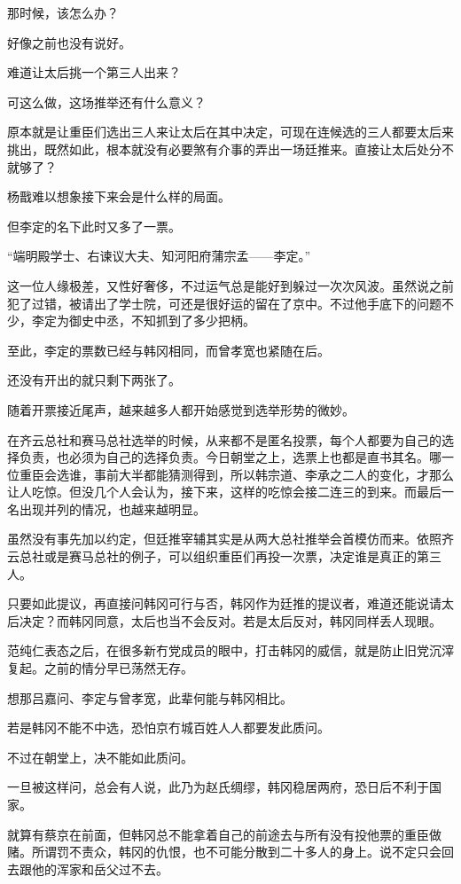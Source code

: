 那时候，该怎么办？

好像之前也没有说好。

难道让太后挑一个第三人出来？

可这么做，这场推举还有什么意义？

原本就是让重臣们选出三人来让太后在其中决定，可现在连候选的三人都要太后来挑出，既然如此，根本就没有必要煞有介事的弄出一场廷推来。直接让太后处分不就够了？

杨戬难以想象接下来会是什么样的局面。

但李定的名下此时又多了一票。

“端明殿学士、右谏议大夫、知河阳府蒲宗孟——李定。”

这一位人缘极差，又性好奢侈，不过运气总是能好到躲过一次次风波。虽然说之前犯了过错，被请出了学士院，可还是很好运的留在了京中。不过他手底下的问题不少，李定为御史中丞，不知抓到了多少把柄。

至此，李定的票数已经与韩冈相同，而曾孝宽也紧随在后。

还没有开出的就只剩下两张了。

随着开票接近尾声，越来越多人都开始感觉到选举形势的微妙。

在齐云总社和赛马总社选举的时候，从来都不是匿名投票，每个人都要为自己的选择负责，也必须为自己的选择负责。今日朝堂之上，选票上也都是直书其名。哪一位重臣会选谁，事前大半都能猜测得到，所以韩宗道、李承之二人的变化，才那么让人吃惊。但没几个人会认为，接下来，这样的吃惊会接二连三的到来。而最后一名出现并列的情况，也越来越明显。

虽然没有事先加以约定，但廷推宰辅其实是从两大总社推举会首模仿而来。依照齐云总社或是赛马总社的例子，可以组织重臣们再投一次票，决定谁是真正的第三人。

只要如此提议，再直接问韩冈可行与否，韩冈作为廷推的提议者，难道还能说请太后决定？而韩冈同意，太后也当不会反对。若是太后反对，韩冈同样丢人现眼。

范纯仁表态之后，在很多新冇党成员的眼中，打击韩冈的威信，就是防止旧党沉滓复起。之前的情分早已荡然无存。

想那吕嘉问、李定与曾孝宽，此辈何能与韩冈相比。

若是韩冈不能不中选，恐怕京冇城百姓人人都要发此质问。

不过在朝堂上，决不能如此质问。

一旦被这样问，总会有人说，此乃为赵氏绸缪，韩冈稳居两府，恐日后不利于国家。

就算有蔡京在前面，但韩冈总不能拿着自己的前途去与所有没有投他票的重臣做赌。所谓罚不责众，韩冈的仇恨，也不可能分散到二十多人的身上。说不定只会回去跟他的浑家和岳父过不去。

